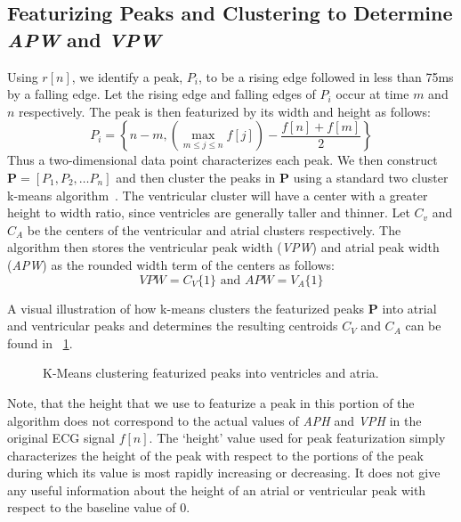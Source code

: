 \documentclass[conference]{IEEEtran}
\newcommand{\APW}{\textit{APW}}
\newcommand{\VPW}{\textit{VPW}}
\newcommand{\APH}{\textit{APH}}
\newcommand{\VPH}{\textit{VPH}}
\begin{document}
\subsection{Featurizing Peaks and Clustering to Determine \APW{} and \VPW}
Using $r[n]$, we identify a peak, $P_i$, to be a rising edge
followed in less than 75ms by a falling edge. Let the
rising edge and falling edges of $P_i$ occur at time $m$ and $n$
respectively. The peak is then featurized by its width and
height as follows:
\begin{equation}
	P_i = \left\{n-m, \left( \max\limits_{m\le j\le n} f[j] \right) - \frac{f[n]+f[m]}{2} \right\}
\end{equation}
Thus a two-dimensional data point characterizes each
peak. We then construct $\mathbf{P} = [P_1, P_2, \dots P_n]$ and then
cluster the peaks in $\mathbf{P}$ using a standard two cluster k-means
algorithm~\cite{k-means}. The ventricular cluster will have a
center with a greater height to width ratio, since
ventricles are generally taller and thinner. Let $C_v$ and $C_A$
be the centers of the ventricular and atrial clusters
respectively. The algorithm then stores the ventricular
peak width (\VPW) and atrial peak width (\APW) as the
rounded width term of the centers as follows:
\begin{equation}
	VPW=C_V\{1\} \text{ and } APW=V_A\{1\}
\end{equation}

A visual illustration of how k-means clusters the
featurized peaks $\mathbf{P}$ into atrial and ventricular peaks and
determines the resulting centroids $C_V$ and $C_A$ can be
found in  \figurename~\ref{fig:kmeans}.


\begin{figure}
	\centering
	\caption{
	K-Means clustering featurized peaks into ventricles and atria.}
		\label{fig:kmeans}
\end{figure}

Note, that the height that we use to featurize a peak in
this portion of the algorithm does not correspond to the
actual values of \APH{} and \VPH{} in the original ECG
signal $f[n]$. The `height' value used for peak
featurization simply characterizes the height of the peak
with respect to the portions of the peak during which its
value is most rapidly increasing or decreasing. It does
not give any useful information about the height of an
atrial or ventricular peak with respect to the baseline
value of 0.
\end{document}
